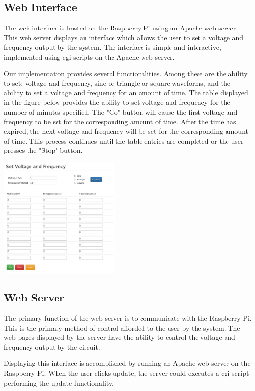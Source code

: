 \documentclass{article}	%
\begin{document}
\begin{multicols}{2}
\subsection{Web Interface}
The web interface is hosted on the Raspberry Pi using an Apache web server.
This web server displays an interface which allows the user to
set a voltage and frequency output by the system. 
The interface is simple and interactive,
implemented using cgi-scripts on the Apache web server.

Our implementation provides several functionalities.
Among these are
the ability to set:
voltage and frequency,
sine or triangle or square waveforms,
and the ability to set a voltage and frequency for an amount of time.
The table displayed
in the figure below
provides the ability to set voltage and frequency for the number
of minutes specified.
The "Go" button will cause the first
voltage and frequency to be set for the corresponding amount of time.
After the time has expired,
the next voltage and frequency will be set for the corresponding amount of time.
This process continues until the table entries are completed or
the user presses the "Stop" button.

\begin{center}
\includegraphics[width=0.45\textwidth,keepaspectratio]{web_interface.pdf}
\end{center}

\subsection{Web Server}
The primary function of the web server is to communicate with the Raspberry Pi.
This is the primary method of control afforded 
to the user by the system. 
The web pages displayed by the server
have the ability to control the voltage and frequency output by the circuit.

Displaying this interface is accomplished by 
running an Apache web server on the Raspberry Pi. 
When the user clicks update, the server could executes 
a cgi-script performing the update functionality.


\end{multicols}
\end{document}
